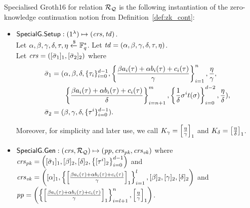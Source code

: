 \begin{definition}
\label{insta:sg16} 
Specialised Groth16 for relation $\mathcal{R}_{\mathcal{Q}}$ is the following instantiation of the zero-knowledge continuation notion from Definition~\ref{def:zk_cont}:
\begin{itemize}
\item ${\mathsf{SpecialG}}.{\mathsf{Setup}}: (1^{\lambda}) \mapsto (\mathit{crs}, \mathit{td})$. \\ 
\noindent Let $\alpha, \beta, \gamma, \delta, \tau, \eta  \xleftarrow{\$} \mathbb{F}_q^{*}$. Let $\mathit{td} = (\alpha, \beta, \gamma, \delta, \tau, \eta)$. \\ 
Let $\mathit{crs} = ([\bar{\sigma}_1]_1, [\bar{\sigma}_2]_2)$ where 
\begin{align*}
\bar{\sigma}_1 = (&\alpha, \beta, \delta, \{\tau_i\}_{i=0}^{d-1}, \left\{\frac{\beta a_i(\tau)+ \alpha b_i(\tau)+ c_i(\tau)}{\gamma}\right\}_{i=1}^n,  
\frac{\eta}{\gamma}, \\ 
&\left\{\frac{\beta a_i(\tau)+ \alpha b_i(\tau)+ c_i(\tau)}{\delta} \right\}_{i=n+1}^m, \left\{\frac{1}{\delta}\sigma^it(\sigma) \right\}_{i=0}^{d-2}, 
\frac{\eta}{\delta}), \\
\bar{\sigma}_2 = (&\beta, \gamma, \delta, \{\tau^i\}_{i=0}^{d-1}). 
\end{align*} 

\noindent Moreover, for simplicity and later use, we call $K_{\gamma} = \left[\frac{\eta}{\gamma}\right]_1$  and $K_{\delta} = \left[ \frac{\eta}{\delta}\right] _1$.

\item ${\mathsf{SpecialG}}.\mathsf{Gen}: (\mathit{crs}, \mathcal{R}_{\mathcal{Q}}) \mapsto (\mathit{pp}, \mathit{crs}_{\mathit{pk}}, \mathit{crs}_{\mathit{vk}})$ where \\
$\mathit{crs}_{\mathit{pk}} = \left([\bar{\sigma}_1]_1, [\beta]_2, [\delta]_2, \left\{[\tau^i]_2\right\}_{i=0}^{d-1}\right)$ and \\ 
$\mathit{crs}_{\mathit{vk}} = \left([\alpha]_1, \left\{ \left[ \frac{\beta a_i(\tau)+ \alpha b_i(\tau)+ c_i(\tau)}{\gamma} \right]_1 \right\}_{i=1}^{l}, 
[\beta]_2, [\gamma]_2, [\delta]_2\right)$ and \\ 
$\mathit{pp} = \left( \left \{ \left[ \frac{\beta a_i(\tau)+ \alpha b_i(\tau)+ c_i(\tau)}{\gamma} \right]_1 \right \}_{i=l+1}^{n}, \left[ \frac{\eta}{\gamma} \right]_1 \right)$.



\end{itemize}
\end{definition}

